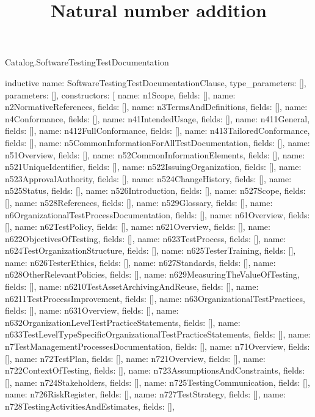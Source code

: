 \begin{lexlean}{Catalog.SoftwareTestingTestDocumentation}
\title{Natural number addition}
\begin{semanticmodule}
inductive{
  name: SoftwareTestingTestDocumentationClause,
  type_parameters: [],
  parameters: [],
  constructors: [
    {name: n1Scope, fields: []},
    {name: n2NormativeReferences, fields: []},
    {name: n3TermsAndDefinitions, fields: []},
    {name: n4Conformance, fields: []},
    {name: n41IntendedUsage, fields: []},
    {name: n411General, fields: []},
    {name: n412FullConformance, fields: []},
    {name: n413TailoredConformance, fields: []},
    {name: n5CommonInformationForAllTestDocumentation, fields: []},
    {name: n51Overview, fields: []},
    {name: n52CommonInformationElements, fields: []},
    {name: n521UniqueIdentifier, fields: []},
    {name: n522IssuingOrganization, fields: []},
    {name: n523ApprovalAuthority, fields: []},
    {name: n524ChangeHistory, fields: []},
    {name: n525Status, fields: []},
    {name: n526Introduction, fields: []},
    {name: n527Scope, fields: []},
    {name: n528References, fields: []},
    {name: n529Glossary, fields: []},
    {name: n6OrganizationalTestProcessDocumentation, fields: []},
    {name: n61Overview, fields: []},
    {name: n62TestPolicy, fields: []},
    {name: n621Overview, fields: []},
    {name: n622ObjectivesOfTesting, fields: []},
    {name: n623TestProcess, fields: []},
    {name: n624TestOrganizationStructure, fields: []},
    {name: n625TesterTraining, fields: []},
    {name: n626TesterEthics, fields: []},
    {name: n627Standards, fields: []},
    {name: n628OtherRelevantPolicies, fields: []},
    {name: n629MeasuringTheValueOfTesting, fields: []},
    {name: n6210TestAssetArchivingAndReuse, fields: []},
    {name: n6211TestProcessImprovement, fields: []},
    {name: n63OrganizationalTestPractices, fields: []},
    {name: n631Overview, fields: []},
    {name: n632OrganizationLevelTestPracticeStatements, fields: []},
    {name: n633TestLevelTypeSpecificOrganizationalTestPracticeStatements, fields: []},
    {name: n7TestManagementProcessesDocumentation, fields: []},
    {name: n71Overview, fields: []},
    {name: n72TestPlan, fields: []},
    {name: n721Overview, fields: []},
    {name: n722ContextOfTesting, fields: []},
    {name: n723AssumptionsAndConstraints, fields: []},
    {name: n724Stakeholders, fields: []},
    {name: n725TestingCommunication, fields: []},
    {name: n726RiskRegister, fields: []},
    {name: n727TestStrategy, fields: []},
    {name: n728TestingActivitiesAndEstimates, fields: []},
}
\end{semanticmodule}
\end{lexlean}
